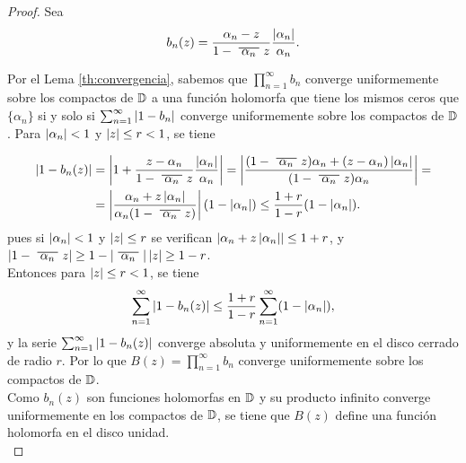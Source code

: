 \begin{proof}
    Sea
    \begin{equation*}
        b_n (z) = \frac{\alpha_n - z}{1 - \xbar{\alpha_n}z} \dfrac{\abs{\alpha_n}}{\alpha_n}.
    \end{equation*}

    Por el Lema \ref{th:convergencia}, sabemos que $\prod_{n=1}^{\infty} b_n$ converge uniformemente sobre los compactos de $\mathbb{D}$ a una función holomorfa que tiene los mismos ceros que $\{\alpha_n\}$ si y solo si $\sum_{n=1}^{\infty} \left\lvert1 - b_n\right\rvert$ converge uniformemente sobre los compactos de $\mathbb{D}$. Para $\left\lvert\alpha_n\right\rvert < 1$ y $\left\lvert z\right\rvert \leq r < 1$, se tiene

    \begin{equation*}
        \begin{split}
            \abs{1 - b_n(z)} & = \abs{1 + \dfrac{z - \alpha_n}{1 - \xbar{\alpha_n}z} \dfrac{\abs{\alpha_n}}{\alpha_n}} = \abs{\dfrac{(1 - \xbar{\alpha_n}z) \alpha_n + (z - \alpha_n) \abs{\alpha_n}}{(1 - \xbar{\alpha_n}z) \alpha_n}} = \\
                             & = \abs{ \dfrac{\alpha_n + z \abs{\alpha_n}}{\alpha_n (1 - \xbar{\alpha_n}z)}} (1 - \abs{\alpha_n}) \leq \dfrac{1 + r}{1 - r} (1 - \abs{\alpha_n}).
        \end{split}
    \end{equation*}
    pues si $\left\lvert\alpha_n\right\rvert < 1$ y $\left\lvert z\right\rvert \leq r$ se verifican $\left\lvert\alpha_n + z \left\lvert\alpha_n\right\rvert\right\rvert \leq 1+r$, y $\abs{1- \xbar{\alpha_n}z} \geq 1-\abs{\xbar{\alpha_n}}\abs{z} \geq 1-r$. \\

    Entonces para $\left\lvert z\right\rvert \leq r < 1$, se tiene
    \begin{equation*}
        \sum_{n=1}^{\infty} \left\lvert1 - b_n(z)\right\rvert \leq \dfrac{1 + r}{1 - r} \sum_{n=1}^{\infty} (1 - \left\lvert\alpha_n\right\rvert),
    \end{equation*}
    y la serie $\sum_{n=1}^{\infty} \left\lvert1 - b_n(z)\right\rvert$ converge absoluta y uniformemente en el disco cerrado de radio $r$. Por lo que $B(z) = \prod_{n=1}^{\infty} b_n$ converge uniformemente sobre los compactos de $\mathbb{D}$. \\

    Como $b_n(z)$ son funciones holomorfas en $\mathbb{D}$ y su producto infinito converge uniformemente en los compactos de $\mathbb{D}$, se tiene que $B(z)$ define una función holomorfa en el disco unidad. \\ %


\end{proof}
